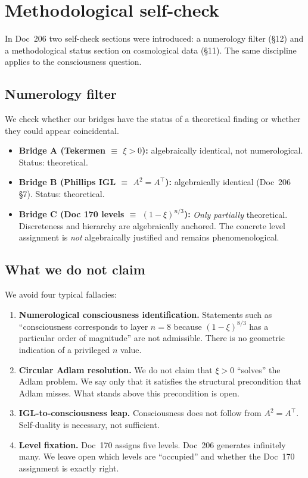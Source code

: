 \section{Methodological self-check}\label{sec:methodology}

In Doc~206 two self-check sections were introduced: a numerology filter (\S12) and a methodological status section on cosmological data (\S11). The same discipline applies to the consciousness question.

\subsection{Numerology filter}

We check whether our bridges have the status of a theoretical finding or whether they could appear coincidental.

\begin{itemize}
\item \textbf{Bridge A (Tekermen $\equiv$ $\xi > 0$):} algebraically identical, not numerological. Status: theoretical.
\item \textbf{Bridge B (Phillips IGL $\equiv$ $A^2 = A^\top$):} algebraically identical (Doc~206 \S7). Status: theoretical.
\item \textbf{Bridge C (Doc 170 levels $\equiv$ $(1-\xi)^{n/3}$):} \emph{Only partially} theoretical. Discreteness and hierarchy are algebraically anchored. The concrete level assignment is \emph{not} algebraically justified and remains phenomenological.
\end{itemize}

\subsection{What we do not claim}

We avoid four typical fallacies:

\begin{enumerate}
\item \textbf{Numerological consciousness identification.} Statements such as ``consciousness corresponds to layer $n = 8$ because $(1-\xi)^{8/3}$ has a particular order of magnitude'' are not admissible. There is no geometric indication of a privileged $n$ value.
\item \textbf{Circular Adlam resolution.} We do not claim that $\xi > 0$ ``solves'' the Adlam problem. We say only that it satisfies the structural precondition that Adlam misses. What stands above this precondition is open.
\item \textbf{IGL-to-consciousness leap.} Consciousness does not follow from $A^2 = A^\top$. Self-duality is necessary, not sufficient.
\item \textbf{Level fixation.} Doc~170 assigns five levels. Doc~206 generates infinitely many. We leave open which levels are ``occupied'' and whether the Doc~170 assignment is exactly right.
\end{enumerate}

